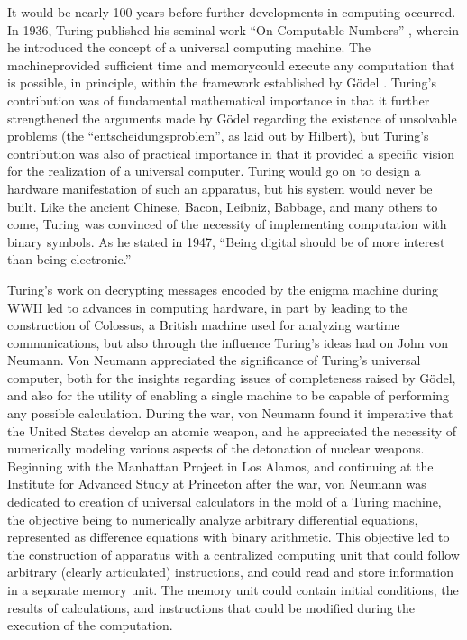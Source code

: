 \documentclass[twocolumn]{article}
\begin{document}
It would be nearly 100 years before further developments in computing occurred. In 1936, Turing published his seminal work ``On Computable Numbers'' \cite{tu1936}, wherein he introduced the concept of a universal computing machine. The machine\textemdash provided sufficient time and memory\textemdash could execute any computation that is possible, in principle, within the framework established by G\"{o}del \cite{}. Turing's contribution was of fundamental mathematical importance in that it further strengthened the arguments made by G\"{o}del regarding the existence of unsolvable problems (the ``entscheidungsproblem'', as laid out by Hilbert), but Turing's contribution was also of practical importance in that it provided a specific vision for the realization of a universal computer. Turing would go on to design a hardware manifestation of such an apparatus, but his system would never be built. Like the ancient Chinese, Bacon, Leibniz, Babbage, and many others to come, Turing was convinced of the necessity of implementing computation with binary symbols. As he stated in 1947, ``Being digital should be of more interest than being electronic.'' \cite{tu1947} 

\cite{babr1949}
Turing's work on decrypting messages encoded by the enigma machine during WWII led to advances in computing hardware, in part by leading to the construction of Colossus, a British machine used for analyzing wartime communications, but also through the influence Turing's ideas had on John von Neumann. Von Neumann appreciated the significance of Turing's universal computer, both for the insights regarding issues of completeness raised by G\"{o}del, and also for the utility of enabling a single machine to be capable of performing any possible calculation. During the war, von Neumann found it imperative that the United States develop an atomic weapon, and he appreciated the necessity of numerically modeling various aspects of the detonation of nuclear weapons. Beginning with the Manhattan Project in Los Alamos, and continuing at the Institute for Advanced Study at Princeton after the war, von Neumann was dedicated to creation of universal calculators in the mold of a Turing machine, the objective being to numerically analyze arbitrary differential equations, represented as difference equations with binary arithmetic. This objective led to the construction of apparatus with a centralized computing unit that could follow arbitrary (clearly articulated) instructions, and could read and store information in a separate memory unit. The memory unit could contain initial conditions, the results of calculations, and instructions that could be modified during the execution of the computation. 
\end{document}

